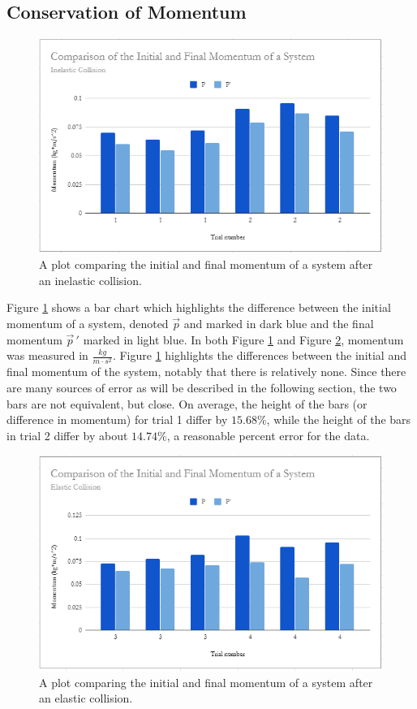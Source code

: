 \documentclass{article}
\theoremstyle{definition}
\begin{document}
\subsection*{Conservation of Momentum}
\begin{figure}
    \includegraphics[width = 1 \columnwidth]{fig4.PNG}
    \caption{A plot comparing the initial and final momentum of a system after an inelastic collision.}
    \label{fig:1}
\end{figure}
Figure \ref{fig:1} shows a bar chart which highlights the difference between the initial momentum of a system, 
denoted $\vec{p}$ and marked in dark blue and the final momentum $\vec{p}\,'$ marked in light blue. In both Figure \ref{fig:1} and Figure \ref{fig:2}, 
momentum was measured in $\frac{kg}{m\cdot s^2}$. Figure \ref{fig:1}
highlights the differences between the initial and final momentum of the system, notably that there is relatively none. 
Since there are many sources of error as will be described in the following section, the two bars are not equivalent, but close. 
On average, the height of the bars (or difference in momentum) for trial 1 differ by $15.68\%$, while the height of the bars
in trial 2 differ by about $14.74\%$, a reasonable percent error for the data.
\begin{figure}
    \includegraphics[width = 1 \columnwidth]{fig5.PNG}
    \caption{A plot comparing the initial and final momentum of a system after an elastic collision.}
    \label{fig:2}
\end{figure}
\end{document}
